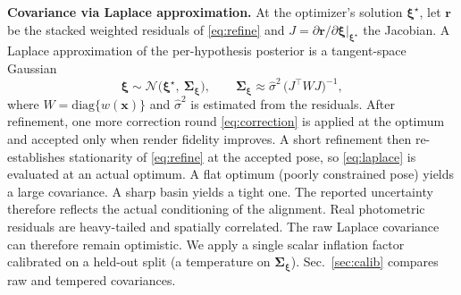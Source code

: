 \documentclass[journal]{IEEEtran}
\begin{document}
\textbf{Covariance via Laplace approximation.} At the optimizer's solution $\bm\xi^\star$, let $\mathbf{r}$ be the stacked weighted residuals of \eqref{eq:refine} and $J=\partial \mathbf{r}/\partial\bm\xi|_{\bm\xi^\star}$ the Jacobian. A Laplace approximation of the per-hypothesis posterior is a tangent-space Gaussian
\begin{equation}
\bm\xi\sim\mathcal{N}\!\big(\bm\xi^\star,\ \bm\Sigma_{\bm\xi}\big),\qquad
\bm\Sigma_{\bm\xi}\approx\hat{\sigma}^2\,\big(J^\top W J\big)^{-1},
\label{eq:laplace}
\end{equation}
where $W=\mathrm{diag}\{w(\mathbf{x})\}$ and $\hat\sigma^2$ is estimated from the residuals. After refinement, one more correction round \eqref{eq:correction} is applied at the optimum and accepted only when render fidelity improves. A short refinement then re-establishes stationarity of \eqref{eq:refine} at the accepted pose, so \eqref{eq:laplace} is evaluated at an actual optimum. A flat optimum (poorly constrained pose) yields a large covariance. A sharp basin yields a tight one. The reported uncertainty therefore reflects the actual conditioning of the alignment. Real photometric residuals are heavy-tailed and spatially correlated. The raw Laplace covariance can therefore remain optimistic. We apply a single scalar inflation factor calibrated on a held-out split (a temperature on $\bm\Sigma_{\bm\xi}$). Sec.~\ref{sec:calib} compares raw and tempered covariances.
\end{document}
